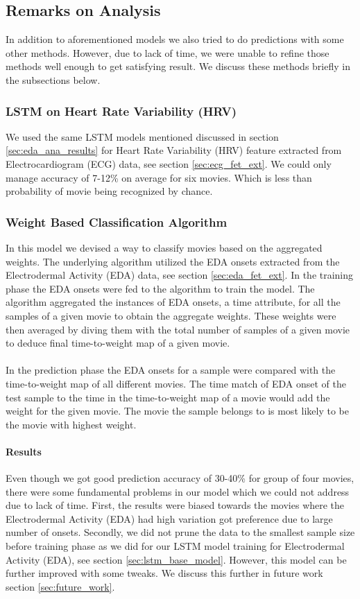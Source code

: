 \subsection{Remarks on Analysis}
In addition to aforementioned models we also tried to do predictions with some other methods. However, due to lack of time, we were unable to refine those methods well enough to get satisfying result. We discuss these methods briefly in the subsections below.
\subsubsection{LSTM on Heart Rate Variability (HRV)} We used the same LSTM models mentioned discussed in section \ref{sec:eda_ana_results} for Heart Rate Variability (HRV) feature extracted from Electrocardiogram (ECG) data, see section \ref{sec:ecg_fet_ext}. We could only manage accuracy of 7-12\% on average for six movies. Which is less than probability of movie being recognized by chance.

\subsubsection{Weight Based Classification Algorithm} In this model we devised a way to classify movies based on the aggregated weights. The underlying algorithm utilized the EDA onsets extracted from the Electrodermal Activity (EDA) data, see section \ref{sec:eda_fet_ext}. In the training phase the EDA onsets were fed to the algorithm to train the model. The algorithm aggregated the instances of EDA onsets, a time attribute, for all the samples of a given movie to obtain the aggregate weights. These weights were then averaged by diving them with the total number of samples of a given movie to deduce final time-to-weight map of a given movie.
\paragraph{} In the prediction phase the EDA onsets for a sample were compared with the time-to-weight map of all different movies. The time match of EDA onset of the test sample to the time in the time-to-weight map of a movie would add the weight for the given movie. The movie the sample belongs to is most likely to be the movie with highest weight.
\paragraph{Results} Even though we got good prediction accuracy of 30-40\% for group of four movies, there were some fundamental problems in our model which we could not address due to lack of time. First, the results were biased towards the movies where the Electrodermal Activity (EDA) had high variation got preference due to large number of onsets. Secondly, we did not prune the data to the smallest sample size before training phase as we did for our LSTM model training for Electrodermal Activity (EDA), see section \ref{sec:lstm_base_model}. However, this model can be further improved with some tweaks. We discuss this further in future work section \ref{sec:future_work}.

